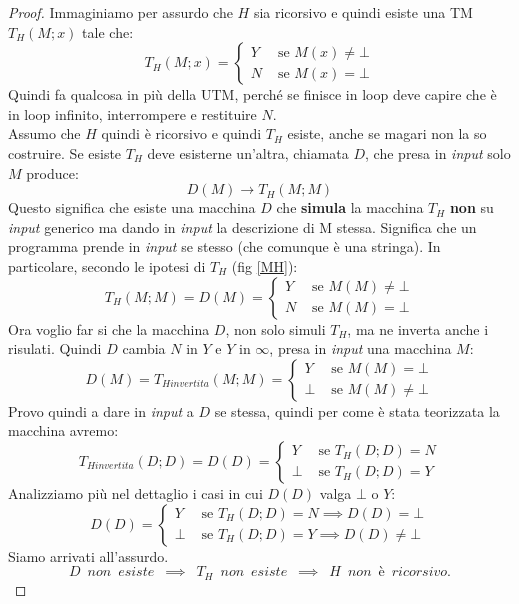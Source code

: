 \begin{proof}
  Immaginiamo per assurdo che $H$ sia ricorsivo e quindi esiste una TM $T_H(M;x)$ tale che:
  \[T_H(M;x) =
    \begin{cases}
      Y& \mbox{ se }M(x)\neq \bot\\
      N& \mbox{ se }M(x) = \bot
      \label{MH}
    \end{cases}
  \]
  Quindi fa qualcosa in più della UTM, perché se finisce in loop deve capire che
  è in loop infinito, interrompere e restituire $N$.\\
  Assumo che $H$ quindi è ricorsivo e quindi $T_H$ esiste, anche se magari non
  la so costruire. Se esiste $T_H$ deve esisterne un'altra, chiamata $D$, che
  presa in \textit{input} solo $M$ produce:
  \[D(M)\to T_H(M;M)\]
  Questo significa che esiste una macchina $D$ che \textbf{simula} la macchina $T_H$ \textbf{non} su \textit{input} generico ma dando in \textit{input} la descrizione di M stessa. Significa che un programma prende in \textit{input} se stesso (che comunque è una stringa). In particolare, secondo le ipotesi di $T_H$ (fig \ref{MH}):
  \[T_H(M;M)= D(M) = 
    \begin{cases}
      Y& \mbox{ se }M(M)\neq \bot\\
      N& \mbox{ se }M(M)=\bot
    \end{cases}
  \]
  Ora voglio far si che la macchina $D$, non solo simuli $T_H$, ma ne inverta anche i risulati. Quindi $D$ cambia $N$ in $Y$ e $Y$ in $\infty$, presa in \textit{input} una macchina
  $M$:
    \[D(M) = T_{Hinvertita}(M;M) =
    \begin{cases}
      Y& \mbox{ se }M(M) = \bot\\
      \bot& \mbox{ se }M(M)\neq \bot
    \end{cases}
  \]
  Provo quindi a dare in \textit{input} a $D$ se stessa, quindi per come è stata teorizzata la macchina avremo:
  \[T_{Hinvertita}(D;D) = D(D) = 
    \begin{cases}
      Y& \mbox{ se }T_H(D;D) = N\\
      \bot & \mbox{ se }T_H(D;D) = Y
    \end{cases}
  \]
  Analizziamo più nel dettaglio i casi in cui $D(D)$ valga $\bot$ o $Y$:
    \[D(D) = 
    \begin{cases}
      Y& \mbox{ se }T_H(D;D) = N \implies D(D) = \bot\\
      \bot & \mbox{ se }T_H(D;D) = Y  \implies D(D) \neq\bot
    \end{cases}
  \]
  Siamo arrivati all'assurdo.  \\
  \[D\,\,\,non\,\,\,esiste\,\,\,\implies\,\,\,T_H\,\,\,non\,\,\,esiste\,\,\,\implies\,\,\,H\,\,\,non\,\,\,è\,\,\,ricorsivo.\]
\end{proof}
